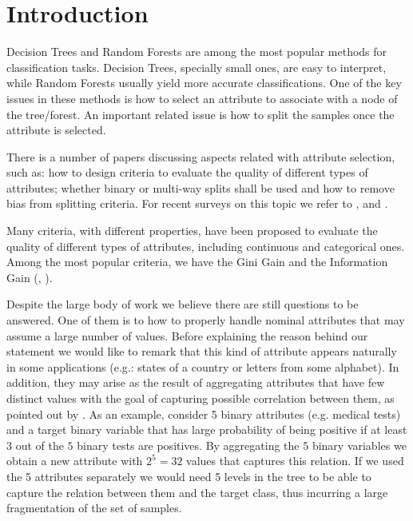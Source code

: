 \newpage

\chapter{Introduction}
\label{chap:introduction}

Decision Trees and Random Forests are among the most popular 
methods for classification tasks. Decision Trees, specially small ones, are easy to interpret,
while Random Forests usually yield more accurate classifications. One of the key issues in these methods
is how to select an attribute to associate with a node of the tree/forest. An important
related issue is how to split the samples once the attribute is selected.

There is a number of papers  discussing aspects related with 
attribute selection, such as:
how to design criteria to evaluate the quality of different types of attributes;
whether binary or multi-way splits shall be used and
how to remove bias from  splitting criteria.
For recent surveys on this topic we refer to \cite{books/sp/datamining2005/RokachM05},
\cite{Loh2014} and \cite{series/sbcs/BarrosCF15}.

Many criteria, with different properties,  have been proposed to evaluate 
the quality of different types of attributes, including
continuous and categorical ones.  Among the most popular criteria,
we have the Gini Gain and the Information Gain (\cite{Breiman84}, \cite{quinlan2014c4}).

Despite the large body of work we believe  there are still questions to be answered.
One of them is to how to  properly handle nominal  attributes that may assume a large number of values.
Before explaining the reason behind our  statement we would
like to remark that this kind of attribute
appears naturally in some applications  (e.g.: states of a country or letters from some alphabet).
In addition, they may arise as the result of aggregating
attributes that have few distinct values
with the goal of capturing possible correlation between them, as pointed out by \cite{Chou:91}.
As an example, consider 5 binary attributes (e.g. medical tests) and a
target binary variable  that has large probability of being positive if at least $3$ out
of the $5$ binary tests are positives. By aggregating
the $5$ binary variables we obtain a new attribute with $2^5=32$
values that  captures  this relation. 
If we used the 5 attributes separately we would 
need 5 levels in the tree to be able to capture the relation between
them and the target class, thus 
incurring a large fragmentation of the set of samples.

